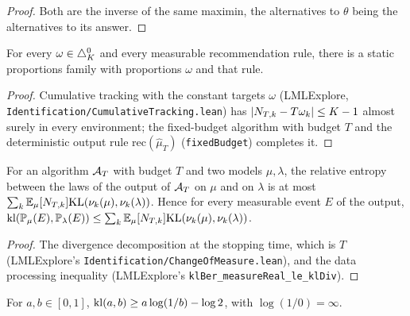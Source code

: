 \begin{proof}
  \leanok
  Both are the inverse of the same maximin, the alternatives to $\theta$ being the alternatives to
  its answer.
\end{proof}

\begin{lemma}
  \label{lem:exists_static}
  \leanok
  For every $\omega \in \triangle_K^0$ and every measurable recommendation rule, there is a static
  proportions family with proportions $\omega$ and that rule.
\end{lemma}

\begin{proof}
  \leanok
  Cumulative tracking with the constant targets $\omega$ (LMLExplore,
  \texttt{Identification/CumulativeTracking.lean}) has $\lvert N_{T,k} - T \omega_k \rvert \le K - 1$
  almost surely in every environment; the fixed-budget algorithm with budget $T$ and the
  deterministic output rule $\mathrm{rec}(\hat\mu_T)$ (\texttt{fixedBudget}) completes it.
\end{proof}

\begin{lemma}
  \label{lem:fb_change_of_measure}
  \leanok
  For an algorithm $\mathcal{A}_T$ with budget $T$ and two models $\mu, \lambda$, the relative entropy
  between the laws of the output of $\mathcal{A}_T$ on $\mu$ and on $\lambda$ is at most
  $\sum_k \mathbb{E}_{\mu}[N_{T,k}] \mathrm{KL}(\nu_k(\mu), \nu_k(\lambda))$. Hence for every measurable event $E$
  of the output, $\mathrm{kl}(\mathbb{P}_{\mu}(E), \mathbb{P}_{\lambda}(E)) \le \sum_k \mathbb{E}_{\mu}[N_{T,k}]
  \mathrm{KL}(\nu_k(\mu), \nu_k(\lambda))$.
\end{lemma}

\begin{proof}
  \leanok
  The divergence decomposition at the stopping time, which is $T$ (LMLExplore's
  \texttt{Identification/ChangeOfMeasure.lean}), and the data processing inequality
  (LMLExplore's \texttt{klBer\_measureReal\_le\_klDiv}).
\end{proof}

\begin{lemma}
  \label{lem:klBer_ge}
  \leanok
  For $a, b \in [0, 1]$, $\mathrm{kl}(a, b) \ge a \log(1/b) - \log 2$, with $\log(1/0) = \infty$.
\end{lemma}

